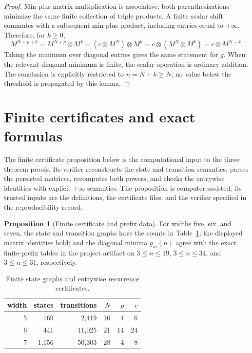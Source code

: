 \documentclass[11pt]{article}
\theoremstyle{definition}
\newtheorem{proposition}[theorem]{Proposition}
\begin{document}
\begin{proof}
Min-plus matrix multiplication is associative: both parenthesizations
minimize the same finite collection of triple products. A finite scalar shift
commutes with a subsequent min-plus product, including entries equal to
\(+\infty\). Therefore, for \(k\geq0\),
\[
M^{N+p+k}=M^{N+p}\otimes M^k
=(c\otimes M^N)\otimes M^k
=c\otimes(M^N\otimes M^k)
=c\otimes M^{N+k}.
\]
Taking the minimum over diagonal entries gives the same statement for \(g\).
When the relevant diagonal minimum is finite, the scalar operation is ordinary
addition. The conclusion is explicitly restricted to \(n=N+k\geq N\); no
value below the threshold is propagated by this lemma.
\end{proof}

\section{Finite certificates and exact formulas}

The finite certificate proposition below is the computational input to the
three theorem proofs. Its verifier reconstructs the state and transition
semantics, parses the persisted matrices, recomputes both powers, and checks
the entrywise identities with explicit \(+\infty\) semantics. The proposition
is computer-assisted: its trusted inputs are the definitions, the certificate
files, and the verifier specified in the reproducibility record.

\begin{proposition}[Finite certificate and prefix data]\label{prop:finite}
For widths five, six, and seven, the state and transition graphs have the
counts in Table~\ref{tab:cert}; the displayed matrix identities hold; and the
diagonal minima \(g_m(n)\) agree with the exact finite-prefix tables in the
project artifact on \(3\le n\le19\), \(3\le n\le34\), and \(3\le n\le31\),
respectively.
\end{proposition}

\begin{table}[ht]
\centering
\caption{Finite state graphs and entrywise recurrence certificates.}
\label{tab:cert}
\begin{tabular}{rrrrrr}
\toprule
width & states & transitions & \(N\) & \(p\) & \(c\)\\
\midrule
5 & 169 & 2,419 & 16 & 4 & 6\\
6 & 441 & 11,025 & 21 & 14 & 24\\
7 & 1,156 & 50,303 & 28 & 4 & 8\\
\bottomrule
\end{tabular}
\end{table}
\end{document}
